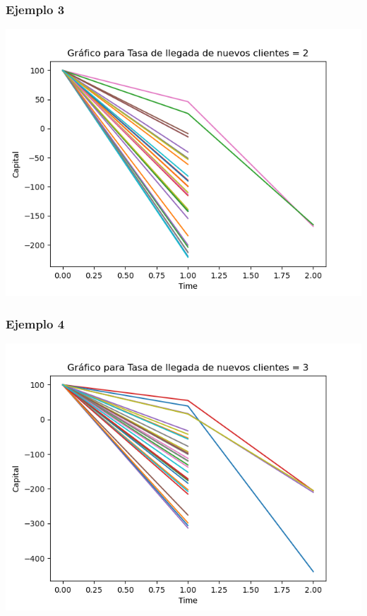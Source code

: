 \documentclass{article}
\begin{document}
 \subsubsection{Ejemplo 3}
 \includegraphics[scale = 0.8]{v3.png}

 \subsubsection{Ejemplo 4}
 \includegraphics[scale = 0.8]{v4.png}
\end{document}
